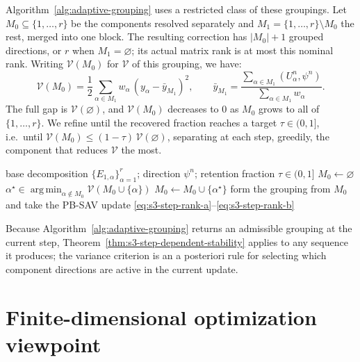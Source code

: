 \documentclass[10pt,onefignum,onetabnum,hidelinks]{siamart251216}
\begin{document}
Algorithm~\ref{alg:adaptive-grouping} uses a restricted class of these groupings.
Let $M_0\subseteq\{1,\dots,r\}$ be the components resolved separately and
$M_1=\{1,\dots,r\}\setminus M_0$ the rest, merged into one block.
The resulting correction has \( |M_0|+1 \) grouped directions, or \(r\) when
\(M_1=\varnothing\); its actual matrix rank is at most this nominal rank.
Writing $\mathcal V(M_0)$ for
$\mathcal V$ of this grouping, we have:
\[
\mathcal V(M_0)
=
\frac12\sum_{\alpha\in M_1}w_\alpha\,(y_\alpha-\bar y_{M_1})^2,
\qquad
\bar y_{M_1}=\frac{\sum_{\alpha\in M_1}(U_\alpha^n,\psi^n)}{\sum_{\alpha\in M_1}w_\alpha}.
\]
The full gap is $\mathcal V(\varnothing)$, and $\mathcal V(M_0)$ decreases to $0$ as
$M_0$ grows to all of $\{1,\dots,r\}$. We refine until the recovered fraction
reaches a target $\tau\in(0,1]$, i.e.\ until
$\mathcal V(M_0)\le(1-\tau)\,\mathcal V(\varnothing)$, separating at each step,
greedily, the component that reduces $\mathcal V$ the most.

\begin{algorithm}[ht]
\caption{Greedy adaptive grouping for the step-$n$ PB-SAV update}
\label{alg:adaptive-grouping}
\begin{algorithmic}[1]
\Require base decomposition $\{E_{1,\alpha}\}_{\alpha=1}^{r}$; direction $\psi^n$;
retention fraction $\tau\in(0,1]$
\State $M_0\gets\varnothing$ 
  \State $\displaystyle\alpha^\star\in\operatorname*{arg\,min}_{\alpha\notin M_0}
  \mathcal V(M_0\cup\{\alpha\})$ 
  \State $M_0\gets M_0\cup\{\alpha^\star\}$
\EndWhile
\State form the grouping from $M_0$ and take the PB-SAV update
\eqref{eq:s3-step-rank-a}--\eqref{eq:s3-step-rank-b}
\end{algorithmic}
\end{algorithm}

Because Algorithm~\ref{alg:adaptive-grouping} returns an admissible grouping at the
current step, Theorem~\ref{thm:s3-step-dependent-stability} applies to any sequence
it produces; the variance criterion is an a posteriori rule for selecting which
component directions are active in the current update.


\section{Finite-dimensional optimization viewpoint}
\label{sec:optimization-viewpoint}
\end{document}
